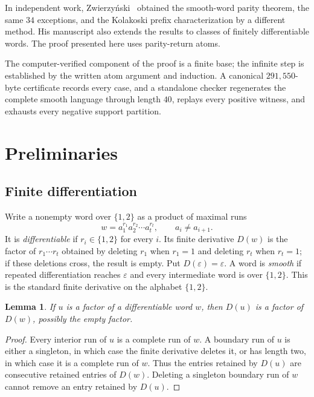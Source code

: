 \documentclass[11pt]{article}
\newtheorem{lemma}[theorem]{Lemma}
\theoremstyle{definition}
\theoremstyle{remark}
\newcommand{\eps}{\varepsilon}
\begin{document}
In independent work, Zwierzy\'nski~\cite{Zwierzynski} obtained the
smooth-word parity theorem, the same $34$ exceptions, and the Kolakoski
prefix characterization by a different method. His manuscript also
extends the results to classes of finitely differentiable words.
The proof presented here uses parity-return atoms.

The computer-verified component of the proof is a finite base; the
infinite step is established by the written atom argument and induction.  A canonical
$291{,}550$-byte certificate records every case, and a standalone
checker regenerates the complete smooth language through length $40$,
replays every positive witness, and exhausts every negative support
partition.

\section{Preliminaries}

\subsection{Finite differentiation}

Write a nonempty word over $\{1,2\}$ as a product of maximal runs
\[
 w=a_1^{r_1}a_2^{r_2}\cdots a_t^{r_t},
 \qquad a_i\ne a_{i+1}.
\]
It is \emph{differentiable} if $r_i\in\{1,2\}$ for every $i$.  Its
finite derivative $D(w)$ is the factor of $r_1\cdots r_t$ obtained by
deleting $r_1$ when $r_1=1$ and deleting $r_t$ when $r_t=1$; if these
deletions cross, the result is empty.  Put $D(\eps)=\eps$.  A word is
\emph{smooth} if repeated differentiation reaches $\eps$ and every
intermediate word is over $\{1,2\}$.  This is the standard finite
derivative on the alphabet $\{1,2\}$.

\begin{lemma}\label{lem:factor-derivative}
If $u$ is a factor of a differentiable word $w$, then $D(u)$ is a factor
of $D(w)$, possibly the empty factor.
\end{lemma}

\begin{proof}
Every interior run of $u$ is a complete run of $w$.  A boundary run of
$u$ is either a singleton, in which case the finite derivative deletes
it, or has length two, in which case it is a complete run of $w$.
Thus the entries retained by $D(u)$ are consecutive retained entries of
$D(w)$.  Deleting a singleton boundary run of $w$ cannot remove an
entry retained by $D(u)$.
\end{proof}
\end{document}
